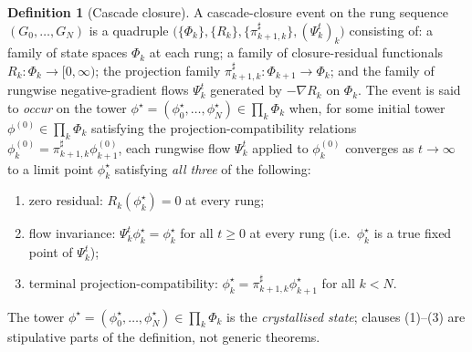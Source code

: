 \documentclass[11pt]{article}
\theoremstyle{definition}
\newtheorem{definition}[theorem]{Definition}
\begin{document}
\begin{definition}[Cascade closure]\label{def:cascade-closure}
A cascade-closure event on the rung sequence $(G_0, \ldots, G_N)$ is a
quadruple $\bigl(\{\Phi_k\}, \{R_k\}, \{\pi^{\sharp}_{k+1, k}\},
(\Psi_k^t)_k\bigr)$ consisting of: a family of state spaces
$\Phi_k$ at each rung; a family of closure-residual functionals
$R_k : \Phi_k \to [0, \infty)$; the projection family
$\pi^{\sharp}_{k+1, k} : \Phi_{k+1} \to \Phi_k$; and the family of
rungwise negative-gradient flows $\Psi_k^t$ generated by $-\nabla R_k$
on $\Phi_k$. The event is said to \emph{occur} on the tower
$\phi^\star = (\phi^\star_0, \ldots, \phi^\star_N) \in \prod_k \Phi_k$
when, for some initial tower $\phi^{(0)} \in \prod_k \Phi_k$
satisfying the projection-compatibility relations
$\phi^{(0)}_k = \pi^{\sharp}_{k+1, k} \phi^{(0)}_{k+1}$, each rungwise
flow $\Psi_k^t$ applied to $\phi^{(0)}_k$ converges as $t \to \infty$
to a limit point $\phi^\star_k$ satisfying \emph{all three} of the
following:
\begin{enumerate}[leftmargin=2.4em, label=\textup{(\arabic*)}, nosep, topsep=2pt]
\item zero residual: $R_k(\phi^\star_k) = 0$ at every rung;
\item flow invariance: $\Psi_k^t \phi^\star_k = \phi^\star_k$ for all
$t \geq 0$ at every rung (i.e.\ $\phi^\star_k$ is a true fixed point
of $\Psi_k^t$);
\item terminal projection-compatibility:
$\phi^\star_k = \pi^{\sharp}_{k+1, k} \phi^\star_{k+1}$ for all $k < N$.
\end{enumerate}
The tower $\phi^\star = (\phi^\star_0, \ldots, \phi^\star_N) \in
\prod_k \Phi_k$ is the \emph{crystallised state}; clauses (1)--(3)
are stipulative parts of the definition, not generic theorems.
\end{definition}
\end{document}
